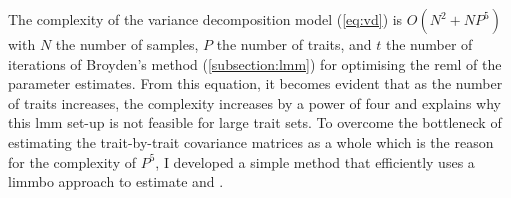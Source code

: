 The complexity of the variance decomposition model (\cref{eq:vd}) is \(O(N^2 + NP^5)\) with \(N\) the number of samples, \(P\) the number of traits, and \(t\) the number of iterations of Broyden's method (\cref{subsection:lmm}) for optimising the \gls{reml} of the parameter estimates. From this equation, it becomes evident that as the number of traits increases, the complexity increases by a power of four and explains why this \gls{lmm} set-up is not feasible for large trait sets. To overcome the bottleneck of estimating the trait-by-trait covariance matrices as a whole which is the reason for the complexity of \(P^5\), I developed a simple method that efficiently uses a \gls{limmbo} approach to estimate  and .